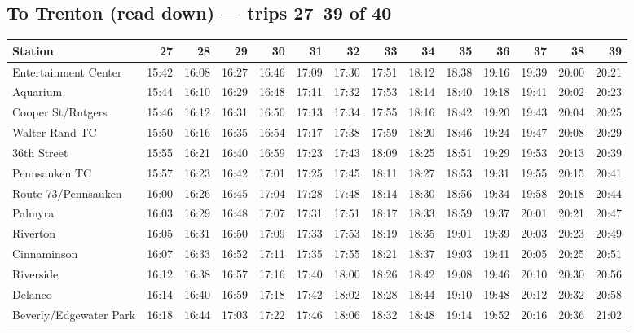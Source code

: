 \subsection*{To Trenton (read down) --- trips 27--39 of 40}
\begin{center}\footnotesize\setlength{\tabcolsep}{3pt}\begin{tabular}{@{}lrrrrrrrrrrrrr@{}}\toprule
Station & 27 & 28 & 29 & 30 & 31 & 32 & 33 & 34 & 35 & 36 & 37 & 38 & 39 \\\midrule
Entertainment Center & 15:42 & 16:08 & 16:27 & 16:46 & 17:09 & 17:30 & 17:51 & 18:12 & 18:38 & 19:16 & 19:39 & 20:00 & 20:21 \\
Aquarium & 15:44 & 16:10 & 16:29 & 16:48 & 17:11 & 17:32 & 17:53 & 18:14 & 18:40 & 19:18 & 19:41 & 20:02 & 20:23 \\
Cooper St/Rutgers & 15:46 & 16:12 & 16:31 & 16:50 & 17:13 & 17:34 & 17:55 & 18:16 & 18:42 & 19:20 & 19:43 & 20:04 & 20:25 \\
Walter Rand TC & 15:50 & 16:16 & 16:35 & 16:54 & 17:17 & 17:38 & 17:59 & 18:20 & 18:46 & 19:24 & 19:47 & 20:08 & 20:29 \\
36th Street & 15:55 & 16:21 & 16:40 & 16:59 & 17:23 & 17:43 & 18:09 & 18:25 & 18:51 & 19:29 & 19:53 & 20:13 & 20:39 \\
Pennsauken TC & 15:57 & 16:23 & 16:42 & 17:01 & 17:25 & 17:45 & 18:11 & 18:27 & 18:53 & 19:31 & 19:55 & 20:15 & 20:41 \\
Route 73/Pennsauken & 16:00 & 16:26 & 16:45 & 17:04 & 17:28 & 17:48 & 18:14 & 18:30 & 18:56 & 19:34 & 19:58 & 20:18 & 20:44 \\
Palmyra & 16:03 & 16:29 & 16:48 & 17:07 & 17:31 & 17:51 & 18:17 & 18:33 & 18:59 & 19:37 & 20:01 & 20:21 & 20:47 \\
Riverton & 16:05 & 16:31 & 16:50 & 17:09 & 17:33 & 17:53 & 18:19 & 18:35 & 19:01 & 19:39 & 20:03 & 20:23 & 20:49 \\
Cinnaminson & 16:07 & 16:33 & 16:52 & 17:11 & 17:35 & 17:55 & 18:21 & 18:37 & 19:03 & 19:41 & 20:05 & 20:25 & 20:51 \\
Riverside & 16:12 & 16:38 & 16:57 & 17:16 & 17:40 & 18:00 & 18:26 & 18:42 & 19:08 & 19:46 & 20:10 & 20:30 & 20:56 \\
Delanco & 16:14 & 16:40 & 16:59 & 17:18 & 17:42 & 18:02 & 18:28 & 18:44 & 19:10 & 19:48 & 20:12 & 20:32 & 20:58 \\
Beverly/Edgewater Park & 16:18 & 16:44 & 17:03 & 17:22 & 17:46 & 18:06 & 18:32 & 18:48 & 19:14 & 19:52 & 20:16 & 20:36 & 21:02 \\

\end{tabular}
\end{center}
